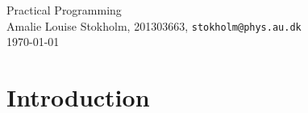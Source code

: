 \documentclass[a4paper,oneside,11pt,article]{memoir}
\author{Amalie Louise Stokholm}
\date{\today}
\begin{document}
\begin{center}
  \sffamily
    {\Large Practical Programming} \\
    \vspace{.8em}
    {Amalie Louise Stokholm, 201303663, \texttt{stokholm@phys.au.dk}} \\
  {\today} \\
\end{center}
\chapter{Introduction}



\printbibliography
\end{document}
